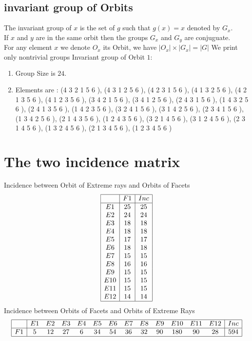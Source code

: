\documentclass[12pt]{article}
\begin{document}
\subsection{invariant group of Orbits}
\noindent The invariant group of $x$ is the set of $g$ such that $g(x)=x$ denoted by $G_x$.\\
If $x$ and $y$ are in the same orbit then the groups $G_x$ and  $G_y$ are conjuguate.\\
For any element $x$ we denote $O_x$ its Orbit, we have $|O_x|\times |G_x|=|G|$
We print only nontrivial groups
Invariant group of Orbit $1$:
\begin{enumerate}
\item Group Size is $24$.
\item Elements are : (4 3 2 1 5 6  ), (4 3 1 2 5 6  ), (4 2 3 1 5 6  ), (4 1 3 2 5 6  ), (4 2 1 3 5 6  ), (4 1 2 3 5 6  ), (3 4 2 1 5 6  ), (3 4 1 2 5 6  ), (2 4 3 1 5 6  ), (1 4 3 2 5 6  ), (2 4 1 3 5 6  ), (1 4 2 3 5 6  ), (3 2 4 1 5 6  ), (3 1 4 2 5 6  ), (2 3 4 1 5 6  ), (1 3 4 2 5 6  ), (2 1 4 3 5 6  ), (1 2 4 3 5 6  ), (3 2 1 4 5 6  ), (3 1 2 4 5 6  ), (2 3 1 4 5 6  ), (1 3 2 4 5 6  ), (2 1 3 4 5 6  ), (1 2 3 4 5 6  )
\end{enumerate}
\section{The two incidence matrix}
Incidence between Orbit of Extreme rays and Orbits of Facets
\begin{equation*}
\begin{array}{|c|c|c|}
\hline
&F1&Inc\\
\hline
E1&25&25\\
E2&24&24\\
E3&18&18\\
E4&18&18\\
E5&17&17\\
E6&18&18\\
E7&15&15\\
E8&16&16\\
E9&15&15\\
E10&15&15\\
E11&15&15\\
E12&14&14\\
\hline
\end{array}
\end{equation*}
Incidence between Orbits of Facets and Orbits of Extreme Rays
\begin{equation*}
\begin{array}{|c|cccccccccccc|c|}
\hline
&E1&E2&E3&E4&E5&E6&E7&E8&E9&E10&E11&E12&Inc\\
\hline
F1&5&12&27&6&34&54&36&32&90&180&90&28&594\\
\hline
\end{array}
\end{equation*}
\end{document}
